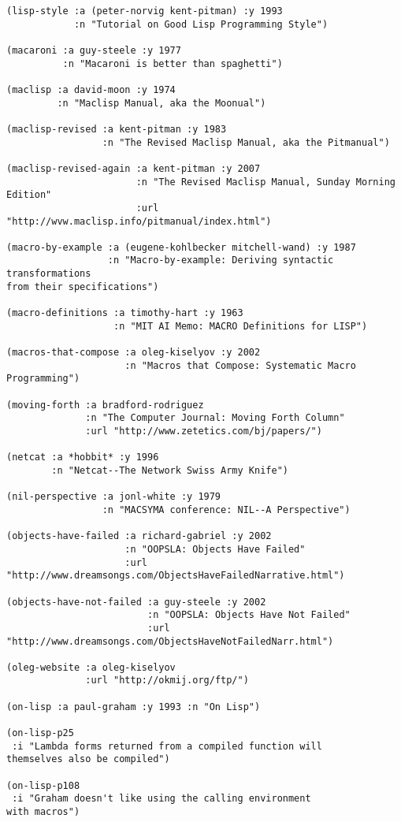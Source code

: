 \begin{verbatim}
(lisp-style :a (peter-norvig kent-pitman) :y 1993
            :n "Tutorial on Good Lisp Programming Style")

(macaroni :a guy-steele :y 1977
          :n "Macaroni is better than spaghetti")

(maclisp :a david-moon :y 1974
         :n "Maclisp Manual, aka the Moonual")

(maclisp-revised :a kent-pitman :y 1983
                 :n "The Revised Maclisp Manual, aka the Pitmanual")

(maclisp-revised-again :a kent-pitman :y 2007
                       :n "The Revised Maclisp Manual, Sunday Morning Edition"
                       :url "http://wvw.maclisp.info/pitmanual/index.html")

(macro-by-example :a (eugene-kohlbecker mitchell-wand) :y 1987
                  :n "Macro-by-example: Deriving syntactic transformations
from their specifications")

(macro-definitions :a timothy-hart :y 1963
                   :n "MIT AI Memo: MACRO Definitions for LISP")

(macros-that-compose :a oleg-kiselyov :y 2002
                     :n "Macros that Compose: Systematic Macro Programming")

(moving-forth :a bradford-rodriguez
              :n "The Computer Journal: Moving Forth Column"
              :url "http://www.zetetics.com/bj/papers/")

(netcat :a *hobbit* :y 1996
        :n "Netcat--The Network Swiss Army Knife")

(nil-perspective :a jonl-white :y 1979
                 :n "MACSYMA conference: NIL--A Perspective")

(objects-have-failed :a richard-gabriel :y 2002
                     :n "OOPSLA: Objects Have Failed"
                     :url
"http://www.dreamsongs.com/ObjectsHaveFailedNarrative.html")

(objects-have-not-failed :a guy-steele :y 2002
                         :n "OOPSLA: Objects Have Not Failed"
                         :url
"http://www.dreamsongs.com/ObjectsHaveNotFailedNarr.html")

(oleg-website :a oleg-kiselyov
              :url "http://okmij.org/ftp/")

(on-lisp :a paul-graham :y 1993 :n "On Lisp")

(on-lisp-p25
 :i "Lambda forms returned from a compiled function will
themselves also be compiled")

(on-lisp-p108
 :i "Graham doesn't like using the calling environment
with macros")


\end{verbatim}
